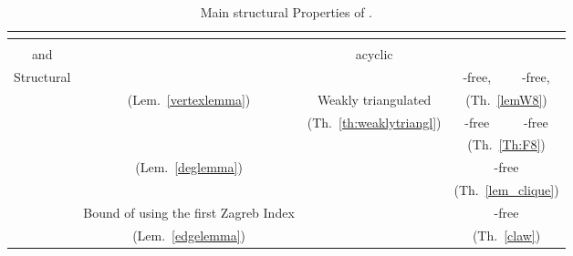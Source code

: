 \documentclass[final]{dmtcs-episciences}
\begin{document}
\begin{center}
\begin{table}[ht]
\centering
\footnotesize
\begin{tabular}{|c|c|c|c|c|}

\hline 
 &\multicolumn{1}{|c|}{}& \multicolumn{3}{|c|}{}\\
\hline
 &\multicolumn{3}{|c|}{}& \\
\hline
 and & & acyclic&&\\
\hline
\hline
\multirow{4}{*}{Structural }&\multicolumn{1}{|c|}{}&&-free, &-free, \\
\multirow{4}{*}{property}&\multicolumn{1}{|c|}{(Lem.~\ref{vertexlemma})}&Weakly triangulated&\multicolumn{2}{|c|}{(Th.~\ref{lemW8})}\\
\cline{4-5}
&\multicolumn{1}{|c|}{}&(Th.~\ref{th:weaklytriangl})&-free&-free\\
\multirow{3}{*}{of }&\multicolumn{1}{|c|}{}&&\multicolumn{2}{|c|}{(Th.~\ref{Th:F8})}\\
\cline{4-5}
&\multicolumn{1}{|c|}{(Lem.~\ref{deglemma})}& &\multicolumn{2}{|c|}{-free}\\
&\multicolumn{1}{|c|}{} &&\multicolumn{2}{|c|}{(Th.~\ref{lem_clique})}\\
\cline{4-5}
&\multicolumn{1}{|c|}{Bound of  using the first Zagreb Index}&&\multicolumn{2}{|c|}{-free}\\
&\multicolumn{1}{|c|}{(Lem.~\ref{edgelemma})}&&\multicolumn{2}{|c|}{(Th.~\ref{claw})}\\
\hline
\end{tabular}
\caption{Main structural Properties of .}
\label{table-structure}
\end{table}
\end{center}
\end{document}
